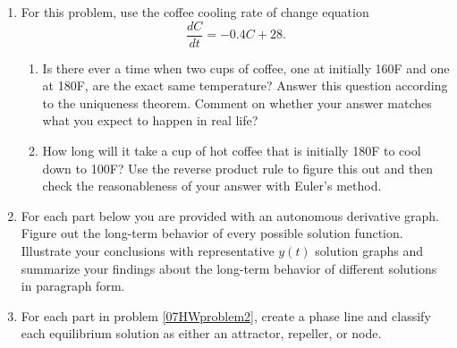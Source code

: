 \begin{enumerate}
\item  For this problem, use the coffee cooling rate of change equation  \[\displaystyle \frac{dC}{dt}=-0.4C+28.\] \label{07HWproblem1}
\begin{enumerate}
\item	Is there ever a time when two cups of coffee, one at initially 160\degree F and one at 180\degree F, are the exact same temperature? Answer this question according to the uniqueness theorem. Comment on whether your answer matches what you expect to happen in real life? 
\item	How long will it take a cup of hot coffee that is initially 180\degree F to cool down to 100\degree F? Use the reverse product rule to figure this out and then check the reasonableness of your answer with Euler's method.

\end{enumerate}
\item	For each part below you are provided with an autonomous derivative graph. Figure out the long-term behavior of every possible solution function. Illustrate your conclusions with representative $y(t)$ solution graphs and summarize your findings about the long-term behavior of different solutions in paragraph form. \label{07HWproblem2} \\
\item	For each part in problem \ref{07HWproblem2}, create a phase line and classify each equilibrium solution as either an attractor, repeller, or node. \label{07HWproblem3}


\end{enumerate}
